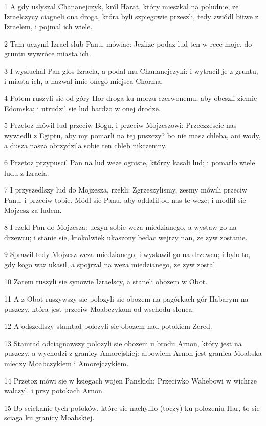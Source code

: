 \par 1 A gdy uslyszal Chananejczyk, król Harat, który mieszkal na poludnie, ze Izraelczycy ciagneli ona droga, która byli szpiegowie przeszli, tedy zwiódl bitwe z Izraelem, i pojmal ich wiele.
\par 2 Tam uczynil Izrael slub Panu, mówiac: Jezlize podaz lud ten w rece moje, do gruntu wywróce miasta ich.
\par 3 I wysluchal Pan glos Izraela, a podal mu Chananejczyki: i wytracil je z gruntu, i miasta ich, a nazwal imie onego miejsca Chorma.
\par 4 Potem ruszyli sie od góry Hor droga ku morzu czerwonemu, aby obeszli ziemie Edomska; i utrudzil sie lud bardzo w onej drodze.
\par 5 Przetoz mówil lud przeciw Bogu, i przeciw Mojzeszowi: Przeczzescie nas wywiedli z Egiptu, aby my pomarli na tej puszczy? bo nie masz chleba, ani wody, a dusza nasza obrzydzila sobie ten chleb nikczemny.
\par 6 Przetoz przypuscil Pan na lud weze ogniste, którzy kasali lud; i pomarlo wiele ludu z Izraela.
\par 7 I przyszedlszy lud do Mojzesza, rzekli: Zgrzeszylismy, zesmy mówili przeciw Panu, i przeciw tobie. Módl sie Panu, aby oddalil od nas te weze; i modlil sie Mojzesz za ludem.
\par 8 I rzekl Pan do Mojzesza: uczyn sobie weza miedzianego, a wystaw go na drzewcu; i stanie sie, ktokolwiek ukaszony bedac wejrzy nan, ze zyw zostanie.
\par 9 Sprawil tedy Mojzesz weza miedzianego, i wystawil go na drzewcu; i bylo to, gdy kogo waz ukasil, a spojrzal na weza miedzianego, ze zyw zostal.
\par 10 Zatem ruszyli sie synowie Izraelscy, a staneli obozem w Obot.
\par 11 A z Obot ruszywszy sie polozyli sie obozem na pagórkach gór Habarym na puszczy, która jest przeciw Moabczykom od wschodu slonca.
\par 12 A odszedlszy stamtad polozyli sie obozem nad potokiem Zered.
\par 13 Stamtad odciagnawszy polozyli sie obozem u brodu Arnon, który jest na puszczy, a wychodzi z granicy Amorejskiej: albowiem Arnon jest granica Moabska miedzy Moabczykiem i Amorejczykiem.
\par 14 Przetoz mówi sie w ksiegach wojen Panskich: Przeciwko Wahebowi w wichrze walczyl, i przy potokach Arnon.
\par 15 Bo sciekanie tych potoków, które sie nachylilo (toczy) ku polozeniu Har, to sie sciaga ku granicy Moabskiej.
